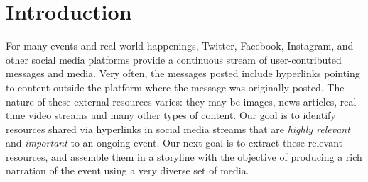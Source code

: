 \documentclass{sig-alternate}
\begin{document}


\section{Introduction}
\label{sec:introduction}


For many events and real-world happenings, Twitter, Facebook, Instagram, and other social media platforms provide a continuous stream of user-contributed messages and media. Very often, the messages posted include hyperlinks pointing to content outside the platform where the message was originally posted. The nature of these external resources varies: they may be images, news articles, real-time video streams and many other types of content. Our goal is to identify resources shared via hyperlinks in social media streams that are \emph{highly relevant} and \emph{important} to an ongoing event. Our next goal is to extract these relevant resources, and assemble them in a storyline with the objective of producing a rich narration of the event using a very diverse set of media.
\end{document}
